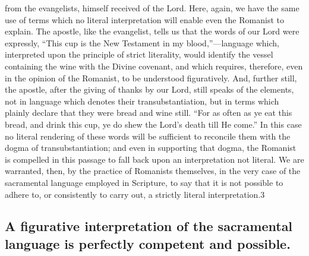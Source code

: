\documentclass[]{book}
\begin{document}
from the evangelists, himself received of the Lord. Here, again, we have the same use of terms which no literal interpretation will enable even the Romanist to explain. The apostle, like the evangelist, tells us that the words of our Lord were expressly, ``This cup is the New Testament in my blood,''---language which, interpreted upon the principle of strict literality, would identify the vessel containing the wine with the Divine covenant, and which requires, therefore, even in the opinion of the Romanist, to be understood figuratively. And, further still, the apostle, after the giving of thanks by our Lord, still speaks of the elements, not in language which denotes their transubstantiation, but in terms which plainly declare that they were bread and wine still. ``For as often as ye eat this bread, and drink this cup, ye do shew the Lord's death till He come.'' In this case no literal rendering of these words will be sufficient to reconcile them with the dogma of transubstantiation; and even in supporting that dogma, the Romanist is compelled in this passage to fall back upon an interpretation not literal. We are warranted, then, by the practice of Romanists themselves, in the very case of the sacramental language employed in Scripture, to say that it is not possible to adhere to, or consistently to carry out, a strictly literal interpretation.3

\hypertarget{a-figurative-interpretation-of-the-sacramental-language-is-perfectly-competent-and-possible.}{%
\subsection{A figurative interpretation of the sacramental language is perfectly competent and possible.}\label{a-figurative-interpretation-of-the-sacramental-language-is-perfectly-competent-and-possible.}}
\end{document}
